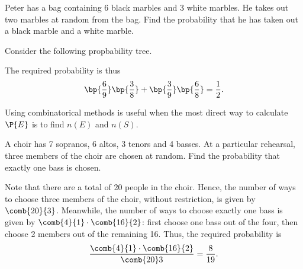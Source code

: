 \begin{sample}
    Peter has a bag containing 6 black marbles and 3 white marbles. He takes out two marbles at random from the bag. Find the probability that he has taken out a black marble and a white marble.
\end{sample}
\begin{sampans}
    Consider the following propbability tree.
    \begin{figure}[H]
        \centering
        \caption{}
    \end{figure}
    The required probability is thus \[\bp{\frac69}\bp{\frac38} + \bp{\frac39}\bp{\frac68} = \frac12.\]
\end{sampans}

\begin{recipe}
    Using combinatorical methods is useful when the most direct way to calculate $\P{E}$ is to find $n(E)$ and $n(S)$.
\end{recipe}

\begin{sample}
    A choir has 7 sopranos, 6 altos, 3 tenors and 4 basses. At a particular rehearsal, three members of the choir are chosen at random. Find the probability that exactly one bass is chosen.
\end{sample}
\begin{sampans}
    Note that there are a total of 20 people in the choir. Hence, the number of ways to choose three members of the choir, without restriction, is given by $\comb{20}{3}$. Meanwhile, the number of ways to choose exactly one bass is given by $\comb{4}{1} \cdot \comb{16}{2}$: first choose one bass out of the four, then choose 2 members out of the remaining 16. Thus, the required probability is \[\frac{\comb{4}{1} \cdot \comb{16}{2}}{\comb{20}3} = \frac8{19}.\]
\end{sampans}